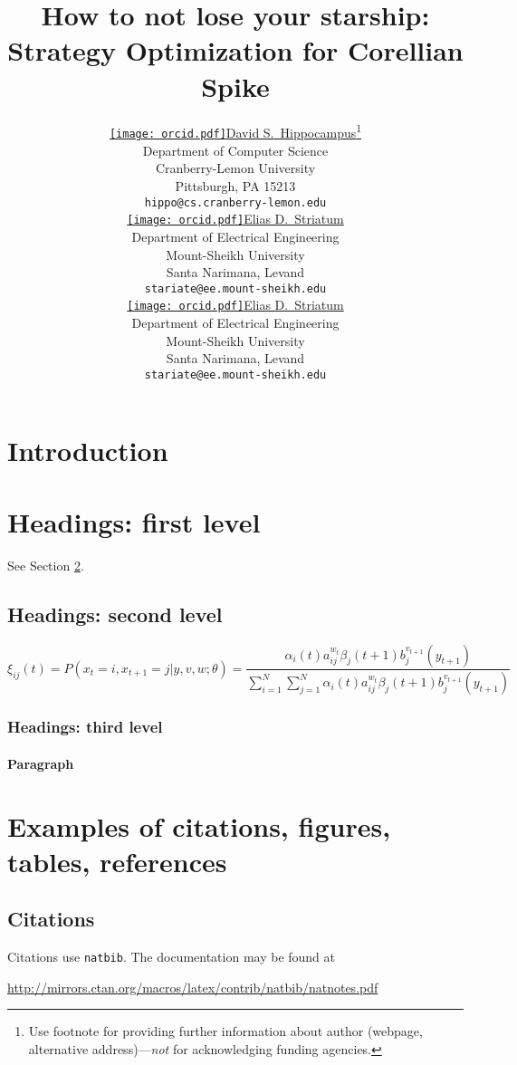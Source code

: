 \documentclass{article}
\title{How to not lose your starship: Strategy Optimization for Corellian Spike}
\author{ \href{https://orcid.org/0000-0000-0000-0000}{\texttt{[image: orcid.pdf]}\hspace{1mm}David S.~Hippocampus}\thanks{Use footnote for providing further
		information about author (webpage, alternative
		address)---\emph{not} for acknowledging funding agencies.} \\
	Department of Computer Science\\
	Cranberry-Lemon University\\
	Pittsburgh, PA 15213 \\
	\texttt{hippo@cs.cranberry-lemon.edu} \\
	\And
	\href{https://orcid.org/0000-0000-0000-0000}{\texttt{[image: orcid.pdf]}\hspace{1mm}Elias D.~Striatum} \\
	Department of Electrical Engineering\\
	Mount-Sheikh University\\
	Santa Narimana, Levand \\
	\texttt{stariate@ee.mount-sheikh.edu} \\
 	\And
	\href{https://orcid.org/0000-0000-0000-0000}{\texttt{[image: orcid.pdf]}\hspace{1mm}Elias D.~Striatum} \\
	Department of Electrical Engineering\\
	Mount-Sheikh University\\
	Santa Narimana, Levand \\
	\texttt{stariate@ee.mount-sheikh.edu} \\
}
\date{}
\begin{document}
\maketitle

\begin{abstract}
	\lipsum[1]
\end{abstract}




\section{Introduction}
\lipsum[2]
\lipsum[3]


\section{Headings: first level}
\label{sec:headings}

\lipsum[4] See Section \ref{sec:headings}.

\subsection{Headings: second level}
\lipsum[5]
\begin{equation}
	\xi _{ij}(t)=P(x_{t}=i,x_{t+1}=j|y,v,w;\theta)= {\frac {\alpha _{i}(t)a^{w_t}_{ij}\beta _{j}(t+1)b^{v_{t+1}}_{j}(y_{t+1})}{\sum _{i=1}^{N} \sum _{j=1}^{N} \alpha _{i}(t)a^{w_t}_{ij}\beta _{j}(t+1)b^{v_{t+1}}_{j}(y_{t+1})}}
\end{equation}

\subsubsection{Headings: third level}
\lipsum[6]

\paragraph{Paragraph}
\lipsum[7]



\section{Examples of citations, figures, tables, references}
\label{sec:others}

\subsection{Citations}
Citations use \verb+natbib+. The documentation may be found at
\begin{center}
	\url{http://mirrors.ctan.org/macros/latex/contrib/natbib/natnotes.pdf}
\end{center}
\end{document}
